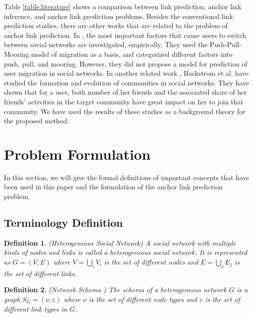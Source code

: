 \documentclass[conference]{IEEEtran}
\newtheorem{definition}{Definition}[section]
\begin{document}
Table \ref{table:literature} shows a comparison between link prediction, anchor link inference, and anchor link prediction problems.
Besides the conventional link prediction studies, there are other works that are related to the problem of anchor link prediction. In \cite{xu2014retaining}, the most important factors that cause users to switch between social networks are investigated, empirically. They used the Push-Pull-Mooring model of migration \cite{jackson1986aspects} as a basis, and categorized different factors into push, pull, and mooring. However, they did not propose a model for prediction of user migration in social networks. In another related work \cite{backstrom2006group}, Backstrom et al. have studied the formation and evolution of communities in social networks. They have shown that for a user, both number of her friends and the associated share of her friends' activities in the target community have great impact on her to join that community. We have used the results of these studies as a background theory for the proposed method.



\section{Problem Formulation}\label{sec:problem}
In this section, we will give the formal definitions of important concepts that have been used in this paper and the formulation of the anchor link prediction problem.

\subsection{Terminology Definition}
\begin{definition}{(Heterogeneous Social Network)}
A social network with multiple kinds of nodes and links is called a heterogeneous social network. It is represented as $G=(V,E)$ where $V=\bigcup_iV_i$ is the set of different nodes and $E=\bigcup_jE_j$ is the set of different links.
\end{definition}

\begin{definition}{(Network Schema \cite{sun2012mining})}
The schema of a heterogeneous network $G$ is a graph $S_G=(\nu, \varepsilon)$ where $\nu$ is the set of different node types and $\varepsilon$ is the set of different link types in $G$.
\end{definition}
\end{document}
